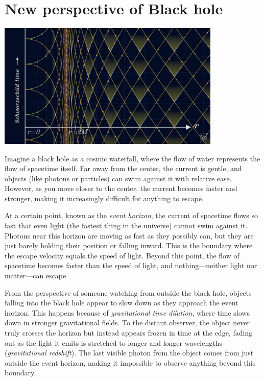 \documentclass[12pt,a4paper]{article}
\begin{document}
\section{New perspective of Black hole}
\begin{center}
    \includegraphics[width=0.8\textwidth]{Screenshot (473)}\\
\end{center}

Imagine a black hole as a cosmic waterfall, where the flow of water represents the flow of spacetime itself. Far away from the center, the current is gentle, and objects (like photons or particles) can swim against it with relative ease. However, as you move closer to the center, the current becomes faster and stronger, making it increasingly difficult for anything to escape.

At a certain point, known as the \textit{event horizon}, the current of spacetime flows so fast that even light (the fastest thing in the universe) cannot swim against it. Photons near this horizon are moving as fast as they possibly can, but they are just barely holding their position or falling inward. This is the boundary where the escape velocity equals the speed of light. Beyond this point, the flow of spacetime becomes faster than the speed of light, and nothing—neither light nor matter—can escape.

From the perspective of someone watching from outside the black hole, objects falling into the black hole appear to slow down as they approach the event horizon. This happens because of \textit{gravitational time dilation}, where time slows down in stronger gravitational fields. To the distant observer, the object never truly crosses the horizon but instead appears frozen in time at the edge, fading out as the light it emits is stretched to longer and longer wavelengths (\textit{gravitational redshift}). The last visible photon from the object comes from just outside the event horizon, making it impossible to observe anything beyond this boundary.
\end{document}
